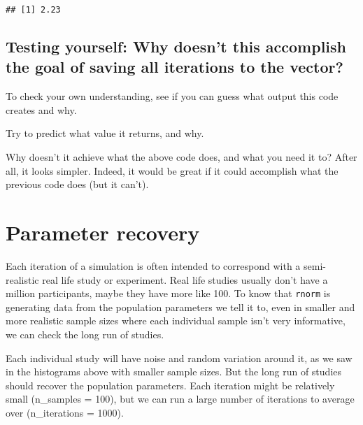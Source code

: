 \documentclass[
]{article}
\begin{document}
\begin{verbatim}
## [1] 2.23
\end{verbatim}

\hypertarget{testing-yourself-why-doesnt-this-accomplish-the-goal-of-saving-all-iterations-to-the-vector}{%
\subsection{Testing yourself: Why doesn't this accomplish the goal of
saving all iterations to the
vector?}\label{testing-yourself-why-doesnt-this-accomplish-the-goal-of-saving-all-iterations-to-the-vector}}

To check your own understanding, see if you can guess what output this
code creates and why.

Try to predict what value it returns, and why.

Why doesn't it achieve what the above code does, and what you need it
to? After all, it looks simpler. Indeed, it would be great if it could
accomplish what the previous code does (but it can't).

\hypertarget{parameter-recovery-1}{%
\section{Parameter recovery}\label{parameter-recovery-1}}

Each iteration of a simulation is often intended to correspond with a
semi-realistic real life study or experiment. Real life studies usually
don't have a million participants, maybe they have more like 100. To
know that \texttt{rnorm} is generating data from the population
parameters we tell it to, even in smaller and more realistic sample
sizes where each individual sample isn't very informative, we can check
the long run of studies.

Each individual study will have noise and random variation around it, as
we saw in the histograms above with smaller sample sizes. But the long
run of studies should recover the population parameters. Each iteration
might be relatively small (n\_samples = 100), but we can run a large
number of iterations to average over (n\_iterations = 1000).
\end{document}
